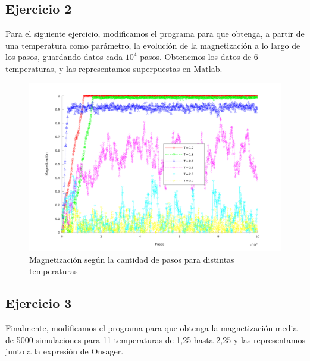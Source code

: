 \documentclass[a4paper,12pt,spanish]{article}
\begin{document}
	
	\subsection{Ejercicio 2}
	
	
	Para el siguiente ejercicio, modificamos el programa para que obtenga, a partir de una temperatura como parámetro, la evolución de la magnetización a lo largo de los pasos, guardando datos cada $10^4$ pasos. Obtenemos los datos de 6 temperaturas, y las representamos superpuestas en Matlab.
	
	
	
	\begin{figure}[H]
		\centering
		\includegraphics[width=1\linewidth]{../obtencion_resultados/grafica_ej2_marcadores_grande}
		\caption{Magnetización según la cantidad de pasos para distintas temperaturas}
		\label{fig:graficaej2}
	\end{figure}
	
	
	
	
	\subsection{Ejercicio 3}
	
	Finalmente, modificamos el programa para que obtenga la magnetización media de 5000 simulaciones para 11 temperaturas de 1,25 hasta 2,25 y las representamos junto a la expresión de Onsager.
	
	
	
\end{document}
